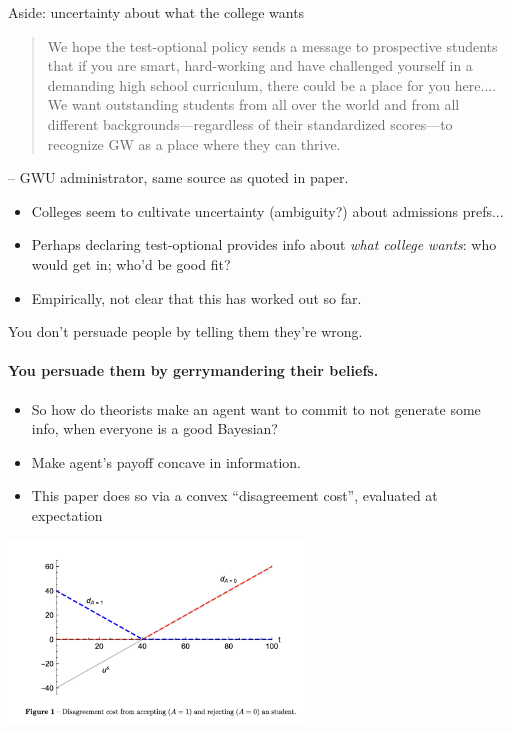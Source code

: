 \documentclass[11pt, aspectratio=169]{beamer}
\theoremstyle{plain}
\theoremstyle{plain}
\theoremstyle{plain}
\theoremstyle{plain}
\begin{document}
\begin{frame}{Aside: uncertainty about what the college wants}
    \begin{quotation}
        We hope the test-optional policy sends a message to prospective students that if you are smart, hard-working and have challenged yourself in a demanding high school curriculum, there could be a place for you here....
        We want outstanding students from all over the world and from all different backgrounds—regardless of their standardized scores—to recognize GW as a place where they can thrive.
    \end{quotation} -- GWU administrator, same source as quoted in paper.  \\ \pause

    \begin{itemize}
        \item Colleges seem to cultivate uncertainty (ambiguity?) about admissions prefs... \pause
        \item Perhaps declaring test-optional provides info about \emph{what college wants}: who would get in; who'd be good fit? \pause
        \item Empirically, not clear that this has worked out so far.
    \end{itemize}
\end{frame}


\begin{frame}{You don't persuade people by telling them they're wrong.}\framesubtitle{You persuade them by gerrymandering their beliefs.}
\begin{itemize}
    \pause 
    \item So how do theorists make an agent want to commit to not generate some info, when everyone is a good Bayesian? \pause
    \item  Make agent's payoff concave in information. \pause
    \item This paper does so via a convex ``disagreement cost'', evaluated at expectation \pause
\end{itemize}
\begin{center} \includegraphics[width=0.6\textwidth]{testoptional-fig1.png} \end{center}
\end{frame}
\end{document}
